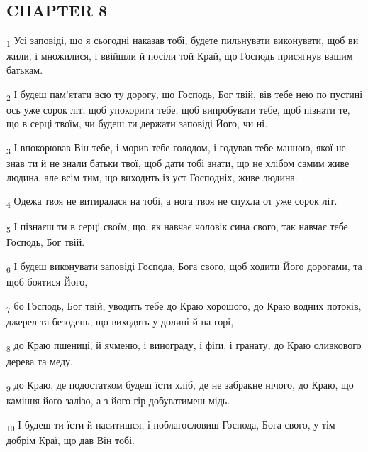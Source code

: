 \subsection{CHAPTER 8}
\begin{tcolorbox}
\textsubscript{1} Усі заповіді, що я сьогодні наказав тобі, будете пильнувати виконувати, щоб ви жили, і множилися, і ввійшли й посіли той Край, що Господь присягнув вашим батькам.
\end{tcolorbox}
\begin{tcolorbox}
\textsubscript{2} І будеш пам'ятати всю ту дорогу, що Господь, Бог твій, вів тебе нею по пустині ось уже сорок літ, щоб упокорити тебе, щоб випробувати тебе, щоб пізнати те, що в серці твоїм, чи будеш ти держати заповіді Його, чи ні.
\end{tcolorbox}
\begin{tcolorbox}
\textsubscript{3} І впокорював Він тебе, і морив тебе голодом, і годував тебе манною, якої не знав ти й не знали батьки твої, щоб дати тобі знати, що не хлібом самим живе людина, але всім тим, що виходить із уст Господніх, живе людина.
\end{tcolorbox}
\begin{tcolorbox}
\textsubscript{4} Одежа твоя не витиралася на тобі, а нога твоя не спухла от уже сорок літ.
\end{tcolorbox}
\begin{tcolorbox}
\textsubscript{5} І пізнаєш ти в серці своїм, що, як навчає чоловік сина свого, так навчає тебе Господь, Бог твій.
\end{tcolorbox}
\begin{tcolorbox}
\textsubscript{6} І будеш виконувати заповіді Господа, Бога свого, щоб ходити Його дорогами, та щоб боятися Його,
\end{tcolorbox}
\begin{tcolorbox}
\textsubscript{7} бо Господь, Бог твій, уводить тебе до Краю хорошого, до Краю водних потоків, джерел та безодень, що виходять у долині й на горі,
\end{tcolorbox}
\begin{tcolorbox}
\textsubscript{8} до Краю пшениці, й ячменю, і винограду, і фіґи, і гранату, до Краю оливкового дерева та меду,
\end{tcolorbox}
\begin{tcolorbox}
\textsubscript{9} до Краю, де подостатком будеш їсти хліб, де не забракне нічого, до Краю, що каміння його залізо, а з його гір добуватимеш мідь.
\end{tcolorbox}
\begin{tcolorbox}
\textsubscript{10} І будеш ти їсти й наситишся, і поблагословиш Господа, Бога свого, у тім добрім Краї, що дав Він тобі.
\end{tcolorbox}
